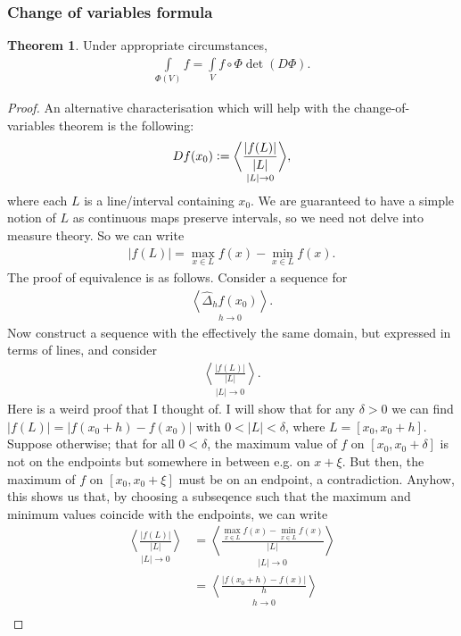 \documentclass{article}
\newcommand{\lv}[1]{\lvert #1\rvert}
\newcommand{\seq}[2]{\underset{#2}{\left\langle #1\right\rangle}}
\newcommand{\vc}{\vcentcolon}
\theoremstyle{definition}
\newtheorem{thm}{Theorem}[subsubsection]
\begin{document}
\subsubsection{Change of variables formula}
\begin{thm}
	Under appropriate circumstances,
	\begin{align*}
		\int\limits_{\Phi(V)}f=\int\limits_Vf\circ\Phi\det(D\Phi).
	\end{align*}
\end{thm}
\begin{proof}
	An alternative characterisation which will help with the change-of-variables theorem is the following:
	\begin{align*}
		Df(x_0)\vc=\seq{\frac{\lvert f(L)\rvert}{\lvert L\rvert}}{\lvert L\rvert\rightarrow0},
	\end{align*}
	where each $L$ is a line/interval containing $x_0$. We are guaranteed to have a simple notion of $L$ as continuous maps preserve intervals, so we need not delve into measure theory. So we can write
	\begin{align*}
		\lv{f(L)}=\max_{x\in L}f(x)-\min_{x\in L}f(x).
	\end{align*}
	The proof of equivalence is as follows. Consider a sequence for
	\begin{align*}
		\seq{\hat\Delta_hf(x_0)}{h\rightarrow0}.
	\end{align*}
	Now construct a sequence with the effectively the same domain, but expressed in terms of lines, and consider
	\begin{align*}
		\seq{\frac{\lvert f(L)\rvert}{\lvert L\rvert}}{\lvert L\rvert\rightarrow0}.
	\end{align*}
	Here is a weird proof that I thought of. I will show that for any $\delta>0$ we can find $\lvert f(L)\rvert=\lv{f(x_0+h)-f(x_0)}$ with $0<\lv{L}<\delta$, where $L=[x_0,x_0+h]$. Suppose otherwise; that for all $0<\delta$, the maximum value of $f$ on $[x_0,x_0+\delta]$ is not on the endpoints but somewhere in between e.g. on $x+\xi$. But then, the maximum of $f$ on $[x_0,x_0+\xi]$ must be on an endpoint, a contradiction. Anyhow, this shows us that, by choosing a subseqence such that the maximum and minimum values coincide with the endpoints, we can write 
	\begin{align*}
		\seq{\frac{\lvert f(L)\rvert}{\lvert L\rvert}}{\lvert L\rvert\rightarrow0}&=\seq{\frac{\max_{x\in L}f(x)-\min_{x\in L}f(x)}{\lvert L\rvert}}{\lvert L\rvert\rightarrow0}\\
		&=\seq{\frac{\lv{f(x_0+h)-f(x)}}{h}}{h\rightarrow0}\\

\end{align*}
\end{proof}
\end{document}
